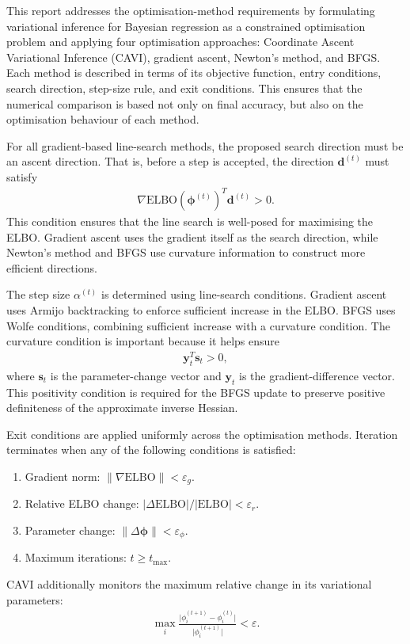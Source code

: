 \documentclass[11pt,a4paper]{article}
\newcommand{\ELBO}{\text{ELBO}}
\begin{document}
This report addresses the optimisation-method requirements by formulating variational inference for Bayesian regression as a constrained optimisation problem and applying four optimisation approaches: Coordinate Ascent Variational Inference (CAVI), gradient ascent, Newton's method, and BFGS. Each method is described in terms of its objective function, entry conditions, search direction, step-size rule, and exit conditions. This ensures that the numerical comparison is based not only on final accuracy, but also on the optimisation behaviour of each method.

For all gradient-based line-search methods, the proposed search direction must be an ascent direction. That is, before a step is accepted, the direction $\bm{d}^{(t)}$ must satisfy
\begin{align}
\nabla \ELBO(\bm{\phi}^{(t)})^T \bm{d}^{(t)} > 0.
\end{align}
This condition ensures that the line search is well-posed for maximising the ELBO. Gradient ascent uses the gradient itself as the search direction, while Newton's method and BFGS use curvature information to construct more efficient directions.

The step size $\alpha^{(t)}$ is determined using line-search conditions. Gradient ascent uses Armijo backtracking to enforce sufficient increase in the ELBO. BFGS uses Wolfe conditions, combining sufficient increase with a curvature condition. The curvature condition is important because it helps ensure
\begin{align}
\bm{y}_t^T \bm{s}_t > 0,
\end{align}
where $\bm{s}_t$ is the parameter-change vector and $\bm{y}_t$ is the gradient-difference vector. This positivity condition is required for the BFGS update to preserve positive definiteness of the approximate inverse Hessian.

Exit conditions are applied uniformly across the optimisation methods. Iteration terminates when any of the following conditions is satisfied:
\begin{enumerate}[label=(\roman*)]
  \item Gradient norm: $\lVert \nabla \ELBO \rVert < \varepsilon_g$.
  \item Relative ELBO change: $\lvert \Delta \ELBO \rvert / \lvert \ELBO \rvert < \varepsilon_r$.
  \item Parameter change: $\lVert \Delta \bm{\phi} \rVert < \varepsilon_\phi$.
  \item Maximum iterations: $t \geq t_{\max}$.
\end{enumerate}
CAVI additionally monitors the maximum relative change in its variational parameters:
\begin{align}
\max_i \frac{\lvert \phi_i^{(t+1)} - \phi_i^{(t)} \rvert}{\lvert \phi_i^{(t+1)} \rvert} < \varepsilon.
\end{align}
\end{document}
